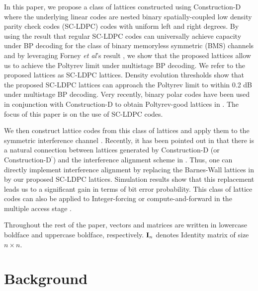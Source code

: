 \documentclass[journal,twocolumn]{IEEEtran}
\begin{document}
In this paper, we propose a class of lattices constructed using Construction-D \cite{BarnesSloane83} where the underlying linear codes are nested binary spatially-coupled low density parity check codes (SC-LDPC) codes with uniform left and right degrees. By using the result that regular SC-LDPC codes can universally achieve capacity under BP decoding for the class of binary memoryless symmetric (BMS) channels  \cite{kudekaruniversal,kumar2013threshold} and by leveraging Forney {\em et al}'s result \cite{forney2000}, we show that the proposed lattices allow us to achieve the Poltyrev limit under multistage BP decoding. We refer to the proposed lattices as SC-LDPC lattices. Density evolution thresholds show that the proposed SC-LDPC lattices can approach the Poltyrev limit to within 0.2 dB under multistage BP decoding. Very recently, binary polar codes have been used in conjunction with Construction-D to obtain Poltyrev-good lattices in \cite{YanLingWu13}. The focus of this paper is on the use of SC-LDPC codes.

We then construct lattice codes from this class of lattices and apply them to the symmetric interference channel \cite{jafar10}.  Recently, it has been pointed out in \cite{Estela13} that there is a natural connection between lattices generated by Construction-D (or Construction-D$^\prime$) and the interference alignment scheme in \cite{jafar10}. Thus, one can directly implement interference alignment by replacing the
Barnes-Wall lattices in \cite{Estela13} by our proposed SC-LDPC lattices. Simulation results show that this replacement
leads us to a significant gain in terms of bit error probability. This class of lattice codes can also be applied to Integer-forcing or compute-and-forward in the multiple access stage \cite{nazer2011CF}.

Throughout the rest of the paper, vectors and matrices are written in lowercase boldface and uppercase boldface, respectively. $\mathbf{I}_{n}$ denotes Identity matrix of size $n\times n$.

\section{Background}\label{Section:Background}
\end{document}
